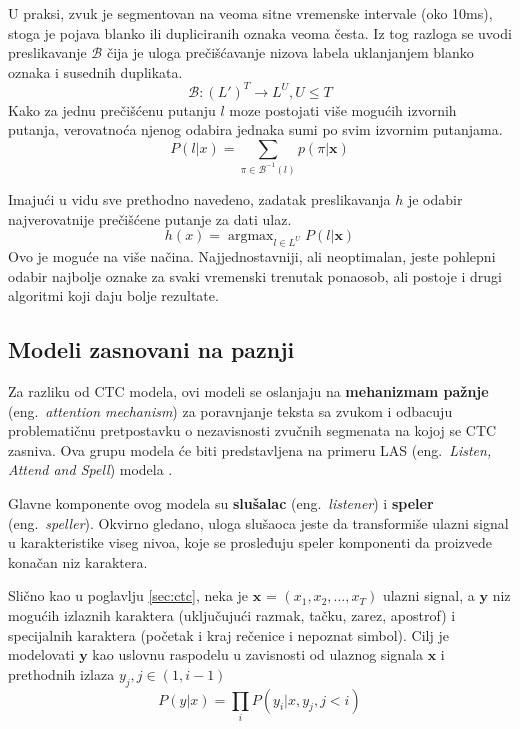 \documentclass[a4paper]{article}
\DeclareMathOperator*{\argmax}{argmax}
\begin{document}
U praksi, zvuk je segmentovan na veoma sitne vremenske intervale (oko 10ms), stoga je pojava blanko ili dupliciranih oznaka veoma česta. 
Iz tog razloga se uvodi preslikavanje $\mathcal{B}$ čija je uloga prečišćavanje nizova labela uklanjanjem blanko oznaka i susednih duplikata.
\begin{equation*}
  \mathcal{B}: (L')^T \rightarrow L^U, U \leq T
\end{equation*}
Kako za jednu prečišćenu putanju $l$ moze postojati više mogućih izvornih putanja, verovatnoća njenog odabira jednaka sumi po svim izvornim putanjama.
\begin{equation}
\label{eq:beta}
  P(l | x) = \sum_{\pi \in \mathcal{B}^{-1}(l)} p(\pi | \textbf{x})
\end{equation}

Imajući u vidu sve prethodno navedeno, zadatak preslikavanja $h$ je odabir najverovatnije prečišćene putanje za dati ulaz.
\begin{equation}
\label{eq:h_x}
  h(x) = \argmax_{l \in L^U} P(l | \textbf{x})
\end{equation}
Ovo je moguće na više načina.
Najjednostavniji, ali neoptimalan, jeste pohlepni odabir najbolje oznake za svaki vremenski trenutak ponaosob, ali postoje i drugi algoritmi koji daju bolje rezultate.


\subsection{Modeli zasnovani na paznji}

Za razliku od CTC modela, ovi modeli se oslanjaju na \textbf{mehanizmam pažnje} (eng.~{\em attention mechanism}) za poravnjanje teksta sa zvukom i odbacuju problematičnu pretpostavku o nezavisnosti zvučnih segmenata na kojoj se CTC zasniva.
Ova grupu modela će biti predstavljena na primeru LAS (eng.~{\em Listen, Attend and Spell}) modela \cite{chan2015las}. 

Glavne komponente ovog modela su \textbf{slušalac} (eng.~{\em listener}) i \textbf{speler} (eng.~{\em speller}).
Okvirno gledano, uloga slušaoca jeste da transformiše ulazni signal u karakteristike viseg nivoa, koje se prosleđuju speler komponenti da proizvede konačan niz karaktera. 

Slično kao u poglavlju \ref{sec:ctc}, neka je $\textbf{x}$ = $(x_1,  x_2,  ...,  x_T)$ ulazni signal, a $\textbf{y}$ niz mogućih izlaznih karaktera (uključujući razmak, tačku, zarez, apostrof) i specijalnih karaktera (početak i kraj rečenice i nepoznat simbol).
Cilj je modelovati $\textbf{y}$ kao uslovnu raspodelu u zavisnosti od ulaznog signala $\textbf{x}$ i prethodnih izlaza $y_j,  j \in (1,  i-1)$
\begin{equation}
  \label{eq:chain}
  P(y | x) = \prod_i P(y_i | x, y_j, j < i)
\end{equation}
\end{document}

